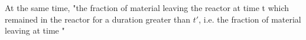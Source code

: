 At the same time, "the fraction of material leaving the reactor at time t which remained in the reactor for a duration greater than $t'$, i.e. the fraction of material leaving at time "  